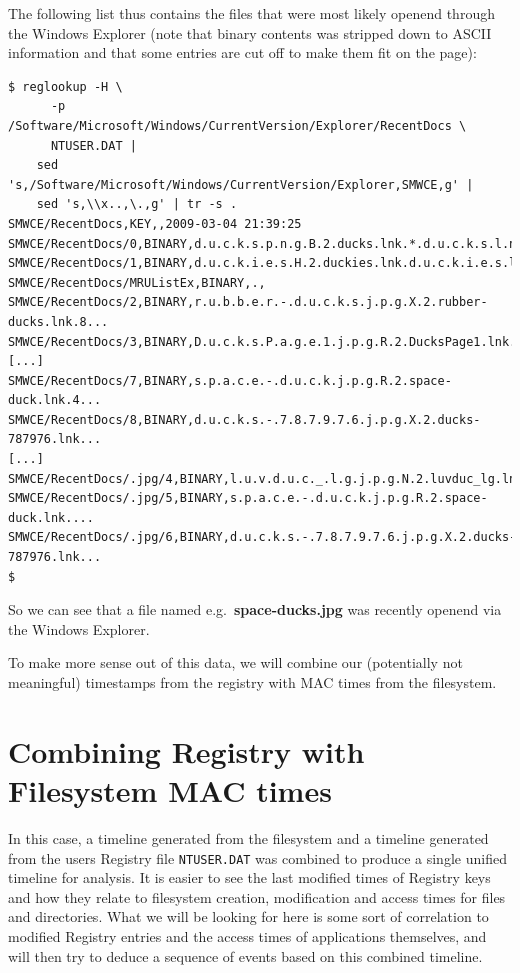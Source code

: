 \documentclass[a4paper,
    11pt,
    normalheadings,
    parindent,
    UKenglish,
    abstracton,
    ]{scrartcl}
\begin{document}
The following list thus contains the files that were most likely openend through the Windows Explorer (note that binary contents was stripped down to ASCII information and that some entries are cut off to make them fit on the page):
\begin{verbatim}
$ reglookup -H \
      -p /Software/Microsoft/Windows/CurrentVersion/Explorer/RecentDocs \
      NTUSER.DAT |
    sed 's,/Software/Microsoft/Windows/CurrentVersion/Explorer,SMWCE,g' |
    sed 's,\\x..,\.,g' | tr -s .
SMWCE/RecentDocs,KEY,,2009-03-04 21:39:25
SMWCE/RecentDocs/0,BINARY,d.u.c.k.s.p.n.g.B.2.ducks.lnk.*.d.u.c.k.s.l.n.k.,
SMWCE/RecentDocs/1,BINARY,d.u.c.k.i.e.s.H.2.duckies.lnk.d.u.c.k.i.e.s.l.n.k.,
SMWCE/RecentDocs/MRUListEx,BINARY,.,
SMWCE/RecentDocs/2,BINARY,r.u.b.b.e.r.-.d.u.c.k.s.j.p.g.X.2.rubber-ducks.lnk.8...
SMWCE/RecentDocs/3,BINARY,D.u.c.k.s.P.a.g.e.1.j.p.g.R.2.DucksPage1.lnk.4...
[...]
SMWCE/RecentDocs/7,BINARY,s.p.a.c.e.-.d.u.c.k.j.p.g.R.2.space-duck.lnk.4...
SMWCE/RecentDocs/8,BINARY,d.u.c.k.s.-.7.8.7.9.7.6.j.p.g.X.2.ducks-787976.lnk...
[...]
SMWCE/RecentDocs/.jpg/4,BINARY,l.u.v.d.u.c._.l.g.j.p.g.N.2.luvduc_lg.lnk....
SMWCE/RecentDocs/.jpg/5,BINARY,s.p.a.c.e.-.d.u.c.k.j.p.g.R.2.space-duck.lnk....
SMWCE/RecentDocs/.jpg/6,BINARY,d.u.c.k.s.-.7.8.7.9.7.6.j.p.g.X.2.ducks-787976.lnk...
$
\end{verbatim}

So we can see that a file named e.g.\, \textbf{space-ducks.jpg} was recently openend via the Windows Explorer.

To make more sense out of this data, we will combine our (potentially not meaningful) timestamps from the registry with MAC times from the filesystem.





\section{Combining Registry with Filesystem MAC times}

In this case, a timeline generated from the filesystem and a timeline generated from the users Registry file \texttt{NTUSER.DAT} was combined to produce a single unified timeline for analysis.
It is easier to see the last modified times of Registry keys and how they relate to filesystem creation, modification and access times for files and directories.
What we will be looking for here is some sort of correlation to modified Registry entries and the access times of applications themselves, and will then try to deduce a sequence of events based on this combined timeline.
\end{document}
